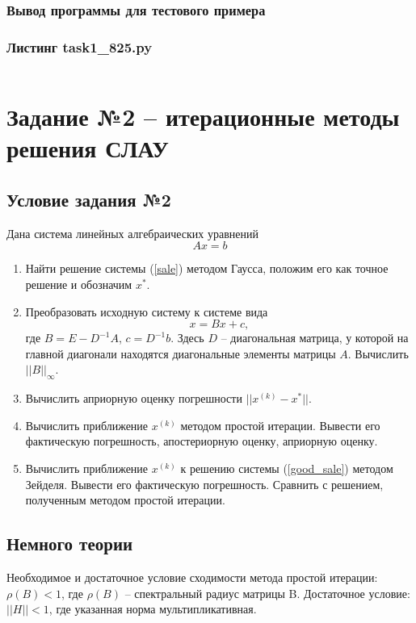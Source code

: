 \subsection{Вывод программы для тестового примера}

\subsection{Листинг task1\_825.py}
\inputminted{python}{code/task1_825.py}

\chapter{Задание №2 -- итерационные методы решения СЛАУ}
\section{Условие задания №2}
Дана система линейных алгебраических уравнений
\begin{equation}
    \label{sale}
    Ax=b
\end{equation}
\begin{enumerate}
\item Найти решение системы (\ref{sale}) методом Гаусса, положим его как точное решение и обозначим $x^*$.
\item Преобразовать исходную систему к системе вида
\begin{equation}
\label{good_sale}
    x = Bx + c,
\end{equation}
где $B=E-D^{-1}A$, $c=D^{-1}b$. Здесь $D$ -- диагональная матрица, у
которой на главной диагонали находятся диагональные элементы
матрицы $A$. Вычислить $||B||_\infty$.
\item  Вычислить априорную оценку погрешности $||x^{(k)}-x^*||$.
\item Вычислить приближение $x^{(k)}$ методом простой итерации. Вывести
его фактическую погрешность, апостериорную оценку, априорную
оценку.
\item Вычислить приближение $x^{(k)}$ к решению системы (\ref{good_sale}) методом Зейделя. Вывести его фактическую погрешность. Сравнить с решением, полученным методом простой итерации.
\end{enumerate}

\section{Немного теории}
Необходимое и достаточное условие сходимости метода простой итерации:
$\rho(B) < 1$, где $\rho(B)$ -- спектральный радиус матрицы B.
Достаточное условие:
$||H|| < 1$, где указанная норма мультипликативная.

